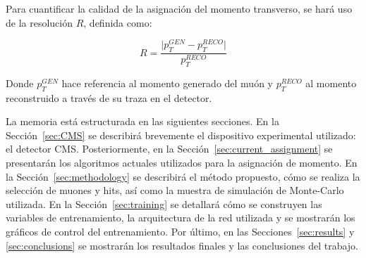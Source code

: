 Para cuantificar la calidad de la asignaci\'on del momento transverso, se har\'a uso de la resoluci\'on $R$, definida como:

\begin{equation}
  R = \dfrac{\lvert p_{T}^{GEN} - p_{T}^{RECO}\rvert}{p_{T}^{RECO}}
\label{eq:R}
\end{equation}

Donde $p_{T}^{GEN}$ hace referencia al momento generado del mu\'on y $p_{T}^{RECO}$ al momento reconstruido a trav\'es de su traza en el detector.

La memoria est\'a estructurada en las siguientes secciones. En la Secci\'on~\ref{sec:CMS} se describir\'a brevemente el dispositivo experimental utilizado: el detector CMS. Posteriormente, en la Secci\'on~\ref{sec:current_assignment} se presentar\'an los algoritmos actuales utilizados para la asignaci\'on de momento. En la Secci\'on~\ref{sec:methodology} se describir\'a el m\'etodo propuesto, c\'omo se realiza la selecci\'on de muones y hits, as\'i como la muestra de simulaci\'on de Monte-Carlo utilizada. En la Secci\'on~\ref{sec:training} se detallar\'a c\'omo se construyen las variables de entrenamiento, la arquitectura de la red utilizada y se mostrar\'an los gr\'aficos de control del entrenamiento. Por \'ultimo, en las Secciones~\ref{sec:results} y \ref{sec:conclusions} se mostrar\'an los resultados finales y las conclusiones del trabajo.
